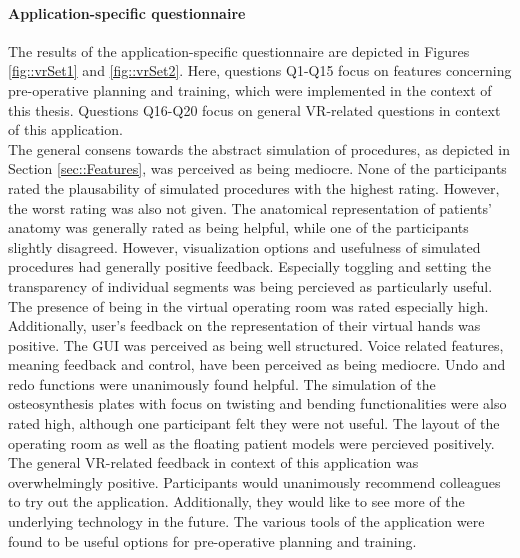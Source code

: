\paragraph{Application-specific questionnaire}
The results of the application-specific questionnaire are depicted
in Figures \ref{fig::vrSet1} and \ref{fig::vrSet2}.
Here, questions Q1-Q15 focus on features concerning
pre-operative planning and training, 
which were implemented in the context of this thesis.
Questions Q16-Q20 focus on general VR-related
questions in context of this application.
\\ The general consens towards the abstract simulation of procedures,
as depicted in Section \ref{sec::Features}, was perceived as 
being mediocre. None of the participants rated the plausability
of simulated procedures with the highest rating.
However, the worst rating was also not given. The anatomical 
representation of patients' anatomy was generally rated as being
helpful, while one of the participants slightly disagreed. 
However, visualization options and usefulness of simulated procedures
had generally positive feedback. Especially toggling and setting the 
transparency of individual segments was being percieved as particularly
useful.
The presence of being in the virtual operating room was rated
especially high. Additionally, user's feedback on the representation
of their virtual hands was positive. 
The GUI was perceived as being well structured.
Voice related features, meaning feedback and control, have been
perceived as being mediocre. 
Undo and redo functions were unanimously found helpful.
The simulation of the osteosynthesis plates with focus on
twisting and bending functionalities were also rated high,
although one participant felt they were not useful.
The layout of the operating room as well as the floating patient
models were percieved positively. 
\\ The general VR-related feedback in context of this application
was overwhelmingly positive. 
Participants would unanimously recommend colleagues to try
out the application. Additionally, they would like to see
more of the underlying technology in the future.
The various tools of the application were found to be 
useful options for pre-operative planning and training.

